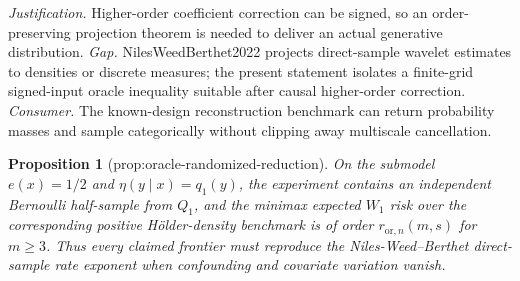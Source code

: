 \documentclass{article}
\newtheorem{proposition}{Proposition}
\begin{document}
\par\smallskip\noindent \textit{Justification.} Higher-order coefficient correction can be signed, so an order-preserving projection theorem is needed to deliver an actual generative distribution. \textit{Gap.} NilesWeedBerthet2022 projects direct-sample wavelet estimates to densities or discrete measures; the present statement isolates a finite-grid signed-input oracle inequality suitable after causal higher-order correction. \textit{Consumer.} The known-design reconstruction benchmark can return probability masses and sample categorically without clipping away multiscale cancellation.

\begin{proposition}[prop:oracle-randomized-reduction]\label{prop:oracle-randomized-reduction}
On the submodel \(e(x)=1/2\) and \(\eta(y\mid x)=q_1(y)\), the experiment contains an independent Bernoulli half-sample from \(Q_1\), and the minimax expected \(W_1\) risk over the corresponding positive Hölder-density benchmark is of order \(r_{\mathrm{or},n}(m,s)\) for \(m\ge3\). Thus every claimed frontier must reproduce the Niles-Weed--Berthet direct-sample rate exponent when confounding and covariate variation vanish.
\end{proposition}
\end{document}
